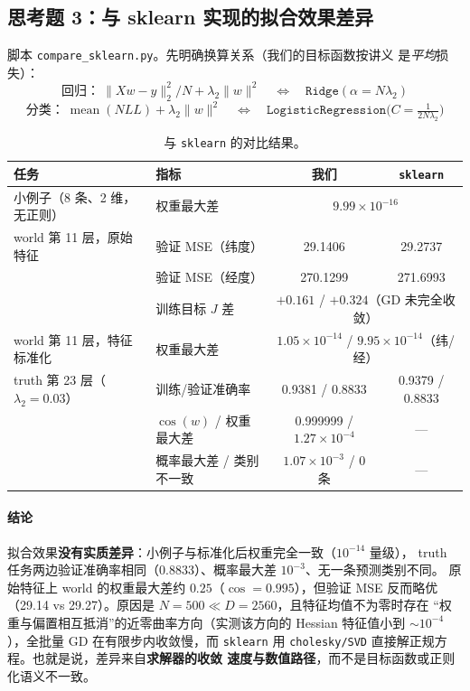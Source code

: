 \documentclass[UTF8,a4paper]{ctexart}
\begin{document}
\subsection{思考题 3：与 sklearn 实现的拟合效果差异}

脚本 \texttt{compare\_sklearn.py}。先明确换算关系（我们的目标函数按讲义
是\emph{平均}损失）：
\[
\text{回归：}\ \|Xw-y\|_2^2/N+\lambda_2\|w\|^2
\quad\Longleftrightarrow\quad
\texttt{Ridge}(\alpha=N\lambda_2)
\]
\[
\text{分类：}\ \operatorname{mean}(NLL)+\lambda_2\|w\|^2
\quad\Longleftrightarrow\quad
\texttt{LogisticRegression}\bigl(C=\tfrac{1}{2N\lambda_2}\bigr)
\]

\begin{table}[htbp]
\centering
\caption{与 \texttt{sklearn} 的对比结果。}
\label{tab:sk}
\small
\begin{tabular}{llcc}
\toprule
任务 & 指标 & 我们 & \texttt{sklearn} \\
\midrule
小例子（8 条、2 维，无正则） & 权重最大差 & \multicolumn{2}{c}{$9.99\times10^{-16}$} \\
world 第 11 层，原始特征 & 验证 MSE（纬度） & 29.1406 & 29.2737 \\
 & 验证 MSE（经度） & 270.1299 & 271.6993 \\
 & 训练目标 $J$ 差 & \multicolumn{2}{c}{$+0.161$ / $+0.324$（GD 未完全收敛）} \\
world 第 11 层，特征标准化 & 权重最大差 & \multicolumn{2}{c}{$1.05\times10^{-14}$ / $9.95\times10^{-14}$（纬/经）} \\
truth 第 23 层（$\lambda_2=0.03$） & 训练/验证准确率 & 0.9381 / 0.8833 & 0.9379 / 0.8833 \\
 & $\cos(w)$ / 权重最大差 & 0.999999 / $1.27\times10^{-4}$ & --- \\
 & 概率最大差 / 类别不一致 & $1.07\times10^{-3}$ / 0 条 & --- \\
\bottomrule
\end{tabular}
\end{table}

\paragraph{结论}
拟合效果\textbf{没有实质差异}：小例子与标准化后权重完全一致（$10^{-14}$ 量级），
truth 任务两边验证准确率相同（0.8833）、概率最大差 $10^{-3}$、无一条预测类别不同。
原始特征上 world 的权重最大差约 $0.25$（$\cos=0.995$），但验证 MSE 反而略优
（29.14 vs 29.27）。原因是 $N=500 \ll D=2560$，且特征均值不为零时存在
“权重与偏置相互抵消”的近零曲率方向（实测该方向的 Hessian 特征值小到
$\sim10^{-4}$），全批量 GD 在有限步内收敛慢，而 \texttt{sklearn} 用
\texttt{cholesky/SVD} 直接解正规方程。也就是说，差异来自\textbf{求解器的收敛
速度与数值路径}，而不是目标函数或正则化语义不一致。
\end{document}
